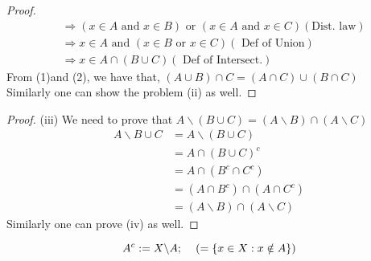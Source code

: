\documentclass[letterpaper, 12pt]{article}
\newcommand{\1}{\mathds{1}}	%
\theoremstyle{definition}
\begin{document}
{\begin{proof}
\begin{align*}
        &\Longrightarrow (x \in A \text{ and } x \in B) \text{ or } (x \in A \text{ and } x \in C) (\text{Dist. law}) \\
        &\Longrightarrow x \in A \text{ and } (x \in B \text{ or } x \in C) (\text{ Def of Union}) \\
        &\Longrightarrow x \in A \cap (B \cup C) (\text{ Def of Intersect.})
    \end{align*}
    From (1)and (2), we have that, $(A \cup B) \cap C = (A \cap C)\cup (B \cap C)$ \\
    Similarly one can show the problem (ii) as well.
\end{proof}
\begin{proof}
    (iii) We need to prove that $A \backslash (B \cup C) = (A \backslash B) \cap (A \backslash C)$ \\
    \begin{align*}
        A \backslash B \cup C &= A \backslash (B \cup C) \\
        &= A \cap (B \cup C)^{c} \\
        &= A \cap (B^{c} \cap C^{c}) \\
        &= (A \cap B^{c}) \cap (A \cap C^{c}) \\
        &= (A \backslash B) \cap (A \backslash C)
    \end{align*}
    Similarly one can prove (iv) as well.
\end{proof}

\[A^c := X \backslash A; \hspace{4mm} ( =\{x \in X: x \notin A\})\]

}
\end{document}
